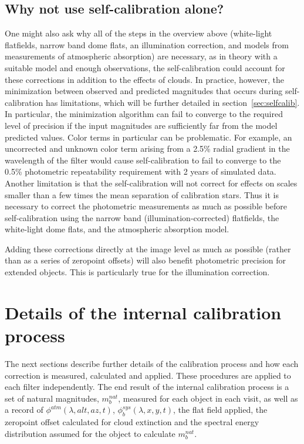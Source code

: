 \documentclass[12pt,preprint]{aastex}
\begin{document}
\subsection{Why not use self-calibration alone?}

One might also ask why all of the steps in the overview above
(white-light flatfields, narrow band dome flats, an illumination
correction, and models from measurements of atmospheric absorption)
are necessary, as in theory with a suitable model and enough observations, the self-calibration could account for
these corrections in addition to the effects of clouds. In practice,
however, the minimization between observed and predicted magnitudes
that occurs during self-calibration has limitations, which will be
further detailed in section~\ref{sec:selfcalib}.  In particular, the
minimization algorithm can fail to converge to the required level of
precision if the input magnitudes are sufficiently far from the model
predicted values.  Color terms in particular can be problematic. For
example, an uncorrected and unknown color term arising from a 2.5\%
radial gradient in the wavelength of the filter would cause
self-calibration to fail to converge to the 0.5\% photometric
repeatability requirement with 2 years of simulated data. Another
limitation is that the self-calibration will not correct for
effects on scales smaller than a few times the mean separation of
calibration stars. Thus it is necessary to correct the photometric
measurements as much as possible before self-calibration using the
narrow band (illumination-corrected) flatfields, the white-light dome
flats, and the atmospheric absorption model.

Adding these corrections directly at the image level as much as
possible (rather than as a series of zeropoint offsets) will also
benefit photometric precision for extended objects. This is
particularly true for the illumination correction.

\section{Details of the internal calibration process}

The next sections describe further details of the calibration process
and how each correction is measured, calculated and applied. These
procedures are applied to each filter independently. The end
result of the internal calibration process is a set of natural
magnitudes, $m_b^{nat}$, measured for each object in each visit, as
well as a record of $\phi^{atm}(\lambda,alt,az,t)$,
$\phi_b^{sys}(\lambda,x,y,t)$, the flat field applied, the
zeropoint offset calculated for cloud extinction and the spectral
energy distribution assumed for the object to calculate $m_b^{nat}$.
\end{document}
